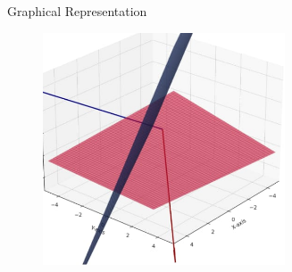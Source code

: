 \documentclass{beamer}
\theoremstyle{remark}
\begin{document}
    \begin{frame}{Graphical Representation}

   \begin{figure}[h!]
\centering
\includegraphics[width=0.7\linewidth]{fig.2.2.29.}

\end{figure}
\end{frame}
\end{document}
